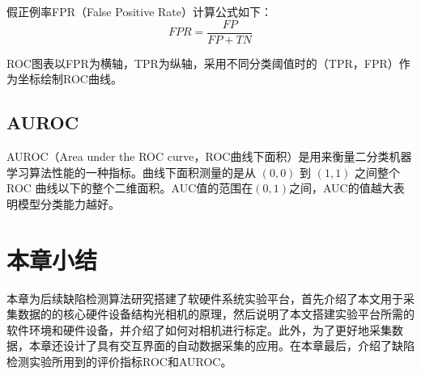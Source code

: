 假正例率FPR（False Positive Rate）计算公式如下：
\begin{equation}
  F P R=\frac{F P}{F P+T N}
\end{equation}

ROC图表以FPR为横轴，TPR为纵轴，采用不同分类阈值时的（TPR，FPR）作为坐标绘制ROC曲线。


\subsection{AUROC
}


AUROC（Area under the ROC curve，ROC曲线下面积）是用来衡量二分类机器学习算法性能的一种指标。曲线下面积测量的是从 $(0,0)$ 到 $(1,1)$ 之间整个 ROC 曲线以下的整个二维面积。AUC值的范围在$(0,1)$之间，AUC的值越大表明模型分类能力越好。\cite{bradleyUseAreaROC1997} 

\section{本章小结}
本章为后续缺陷检测算法研究搭建了软硬件系统实验平台，首先介绍了本文用于采集数据的的核心硬件设备结构光相机的原理，然后说明了本文搭建实验平台所需的软件环境和硬件设备，并介绍了如何对相机进行标定。此外，为了更好地采集数据，本章还设计了具有交互界面的自动数据采集的应用。在本章最后，介绍了缺陷检测实验所用到的评价指标ROC和AUROC。